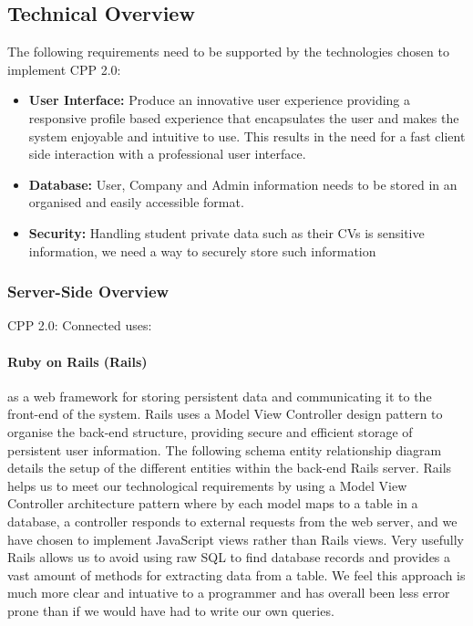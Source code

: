 \subsection{Technical Overview}
	The following requirements need to be supported by the technologies chosen to implement CPP 2.0:
		\begin{itemize}
		  \item \textbf{User Interface:} Produce an innovative user experience providing a responsive profile based experience that encapsulates the user and makes the system enjoyable and intuitive to use. This results in the need for a fast client side interaction with a professional user interface.
		  \item \textbf{Database:} User, Company and Admin information needs to be stored in an organised and easily accessible format.
		  \item \textbf{Security:} Handling student private data such as their CVs is sensitive information, we need a way to securely store such information 
		\end{itemize} 

	\subsubsection{Server-Side Overview}
		CPP 2.0: Connected uses:
		\paragraph{Ruby on Rails (Rails)\cite{ror}} as a web framework for storing persistent data and communicating it to the front-end of the system. Rails uses a Model View Controller design pattern to organise the back-end structure, providing secure and efficient storage of persistent user information. The following schema entity relationship diagram details the setup of the different entities within the back-end Rails server.
		Rails helps us to meet our technological requirements by using a Model View Controller architecture pattern where by each model maps to a table in a database, a controller responds to external requests from the web server, and we have chosen to implement JavaScript views rather than Rails views.
		Very usefully Rails allows us to avoid using raw SQL to find database records and provides a vast amount of methods for extracting data from a table. We feel this approach is much more clear and intuative to a programmer and has overall been less error prone than if we would have had to write our own queries. %

